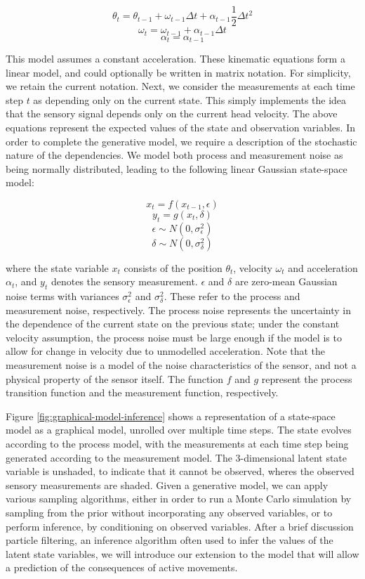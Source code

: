 \documentclass[english,floatsintext,man]{apa6}
\theoremstyle{definition}
\theoremstyle{definition}
\theoremstyle{remark}
\begin{document}
\[ \theta_t = \theta_{t-1} + \omega_{t-1} \Delta t + \alpha_{t-1} \frac{1}{2} \Delta t^2 \]
\[ \omega_{t} = \omega_{t-1} + \alpha_{t-1} \Delta t \]
\[ \alpha_t = \alpha_{t-1} \]

This model assumes a constant acceleration. These kinematic equations
form a linear model, and could optionally be written in matrix notation.
For simplicity, we retain the current notation. Next, we consider the
measurements at each time step \(t\) as depending only on the current
state. This simply implements the idea that the sensory signal depends
only on the current head velocity. The above equations represent the
expected values of the state and observation variables. In order to
complete the generative model, we require a description of the
stochastic nature of the dependencies. We model both process and
measurement noise as being normally distributed, leading to the
following linear Gaussian state-space model:

\[ x_t = f(x_{t-1}, \epsilon) \] \[ y_{t} = g(x_t, \delta) \]
\[ \epsilon \sim N(0, \sigma^2_\epsilon) \]
\[ \delta \sim N(0, \sigma^2_\delta) \]

where the state variable \(x_t\) consists of the position \(\theta_t\),
velocity \(\omega_t\) and acceleration \(\alpha_t\), and \(y_{t}\)
denotes the sensory measurement. \(\epsilon\) and \(\delta\) are
zero-mean Gaussian noise terms with variances \(\sigma^2_\epsilon\) and
\(\sigma^2_\delta\). These refer to the process and measurement noise,
respectively. The process noise represents the uncertainty in the
dependence of the current state on the previous state; under the
constant velocity assumption, the process noise must be large enough if
the model is to allow for change in velocity due to unmodelled
acceleration. Note that the measurement noise is a model of the noise
characteristics of the sensor, and not a physical property of the sensor
itself. The function \(f\) and \(g\) represent the process transition
function and the measurement function, respectively.

Figure \ref{fig:graphical-model-inference} shows a representation of a
state-space model as a graphical model, unrolled over multiple time
steps. The state evolves according to the process model, with the
measurements at each time step being generated according to the
measurement model. The 3-dimensional latent state variable is unshaded,
to indicate that it cannot be observed, wheres the observed sensory
measurements are shaded. Given a generative model, we can apply various
sampling algorithms, either in order to run a Monte Carlo simulation by
sampling from the prior without incorporating any observed variables, or
to perform inference, by conditioning on observed variables. After a
brief discussion particle filtering, an inference algorithm often used
to infer the values of the latent state variables, we will introduce our
extension to the model that will allow a prediction of the consequences
of active movements.
\end{document}
